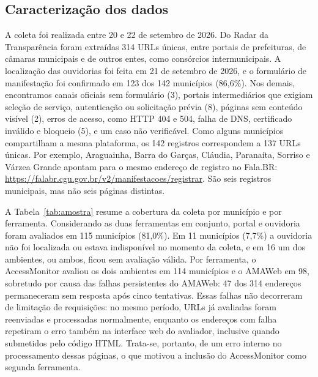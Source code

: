 \documentclass[12pt]{article}
\begin{document}
\subsection{Caracterização dos dados}

A coleta foi realizada entre 20 e 22 de setembro de 2026. Do Radar da Transparência foram extraídas 314 URLs únicas, entre portais de prefeituras, de câmaras municipais e de outros entes, como consórcios intermunicipais. A localização das ouvidorias foi feita em 21 de setembro de 2026, e o formulário de manifestação foi confirmado em 123 dos 142 municípios (86,6\%). Nos demais, encontramos canais oficiais sem formulário (3), portais intermediários que exigiam seleção de serviço, autenticação ou solicitação prévia (8), páginas sem conteúdo visível (2), erros de acesso, como HTTP 404 e 504, falha de DNS, certificado inválido e bloqueio (5), e um caso não verificável. Como alguns municípios compartilham a mesma plataforma, os 142 registros correspondem a 137 URLs únicas. Por exemplo, Araguainha, Barra do Garças, Cláudia, Paranaíta, Sorriso e Várzea Grande apontam para o mesmo endereço de registro no Fala.BR: \url{https://falabr.cgu.gov.br/v2/manifestacoes/registrar}. São seis registros municipais, mas não seis páginas distintas.

A Tabela~\ref{tab:amostra} resume a cobertura da coleta por município e por ferramenta. Considerando as duas ferramentas em conjunto, portal e ouvidoria foram avaliados em 115 municípios (81,0\%). Em 11 municípios (7,7\%) a ouvidoria não foi localizada ou estava indisponível no momento da coleta, e em 16 um dos ambientes, ou ambos, ficou sem avaliação válida. Por ferramenta, o AccessMonitor avaliou os dois ambientes em 114 municípios e o AMAWeb em 98, sobretudo por causa das falhas persistentes do AMAWeb: 47 dos 314 endereços permaneceram sem resposta após cinco tentativas. Essas falhas não decorreram de limitação de requisições: no mesmo período, URLs já avaliadas foram reenviadas e processadas normalmente, enquanto os endereços com falha repetiram o erro também na interface web do avaliador, inclusive quando submetidos pelo código HTML. Trata-se, portanto, de um erro interno no processamento dessas páginas, o que motivou a inclusão do AccessMonitor como segunda ferramenta.
\end{document}
